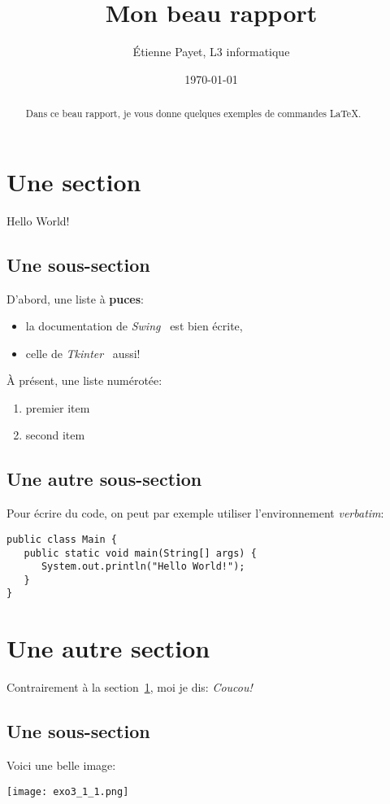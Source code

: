 \documentclass{article}
\title{Mon beau rapport}
\author{\'Etienne Payet, L3 informatique}
\date{\today}
\begin{document}
\maketitle %


\begin{abstract}
  Dans ce beau rapport, je vous donne quelques exemples
  de commandes \LaTeX.
\end{abstract}

\section{Une section}
\label{section:hello} %

Hello World!

\subsection{Une sous-section}
D'abord, une liste à \textbf{puces}:
\begin{itemize}
\item la documentation de \textit{Swing}~\cite{swingDoc}
  est bien écrite,
\item celle de \textit{Tkinter}~\cite{tkinterDoc} aussi!
\end{itemize}

\`A présent, une liste numérotée:
\begin{enumerate}
\item premier item
\item second item
\end{enumerate}

\subsection{Une autre sous-section}
Pour écrire du code, on peut par exemple utiliser l'environnement
\textit{verbatim}:
\begin{verbatim}
public class Main {
   public static void main(String[] args) {
      System.out.println("Hello World!");
   }
}
\end{verbatim}

\section{Une autre section}

Contrairement à la section~\ref{section:hello},
moi je dis: \textit{Coucou!}

\subsection{Une sous-section}
Voici une belle image:
\begin{center}
  \texttt{[image: exo3\_1\_1.png]}
\end{center}





\end{document}
